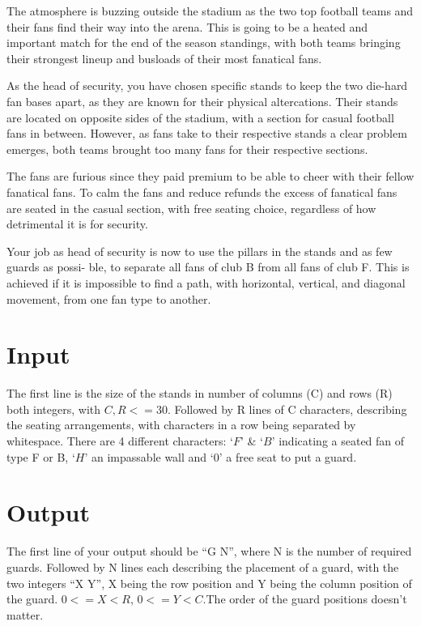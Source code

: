 


The atmosphere is buzzing outside the stadium as the two top football teams and their fans find their
way into the arena. This is going to be a heated and important match for the end of the season
standings, with both teams bringing their strongest lineup and busloads of their most fanatical fans.

As the head of security, you have chosen specific stands to keep the two die-hard fan bases apart,
as they are known for their physical altercations. Their stands are located on opposite sides of the
stadium, with a section for casual football fans in between. However, as fans take to their respective
stands a clear problem emerges, both teams brought too many fans for their respective sections.

The fans are furious since they paid premium to be able to cheer with their fellow fanatical fans.
To calm the fans and reduce refunds the excess of fanatical fans are seated in the casual section, with
free seating choice, regardless of how detrimental it is for security.

Your job as head of security is now to use the pillars in the stands and as few guards as possi-
ble, to separate all fans of club B from all fans of club F. This is achieved if it is impossible to find a
path, with horizontal, vertical, and diagonal movement, from one fan type to another.

\section*{Input}

The first line is the size of the stands in number of columns (C) and rows (R) both integers, with $C,R <= 30$.
Followed by R lines of C characters, describing the seating arrangements, with characters 
in a row being separated by whitespace. There are 4 different characters: $‘F’$ \& $‘B’$ indicating a seated 
fan of type F or B, $‘H’$ an impassable wall and $‘0’$ a free seat to put a guard.

\section*{Output}

The first line of your output should be “G N”, where N is the number of required guards. Followed 
by N lines each describing the placement of a guard, with the two integers “X Y”, X being the row 
position and Y being the column position of the guard. $0 <= X < R$, $0 <= Y < C$.The order of the 
guard positions doesn't matter.
